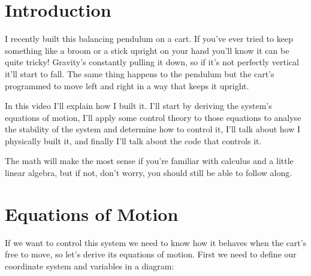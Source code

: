 \documentclass{article}
\begin{document}
\tableofcontents

\section{Introduction}

I recently built this balancing pendulum on a cart. If you've ever tried to keep something like a broom or a stick upright on your hand you'll know it can be quite tricky! Gravity's constantly pulling it down, so if it’s not perfectly vertical it’ll start to fall. The same thing happens to the pendulum but the cart's programmed to move left and right in a way that keeps it upright.

In this video I’ll explain how I built it. I'll start by deriving the system's equations of motion, I'll apply some control theory to those equations to analyse the stability of the system and determine how to control it, I'll talk about how I physically built it, and finally I'll talk about the code that controls it.

The math will make the most sense if you're familiar with calculus and a little linear algebra, but if not, don't worry, you should still be able to follow along.

\section{Equations of Motion}

If we want to control this system we need to know how it behaves when the cart's free to move, so let’s derive its equations of motion. First we need to define our coordinate system and variables in a diagram:

\begin{figure}[H]
  \centering
\end{figure}
\end{document}
